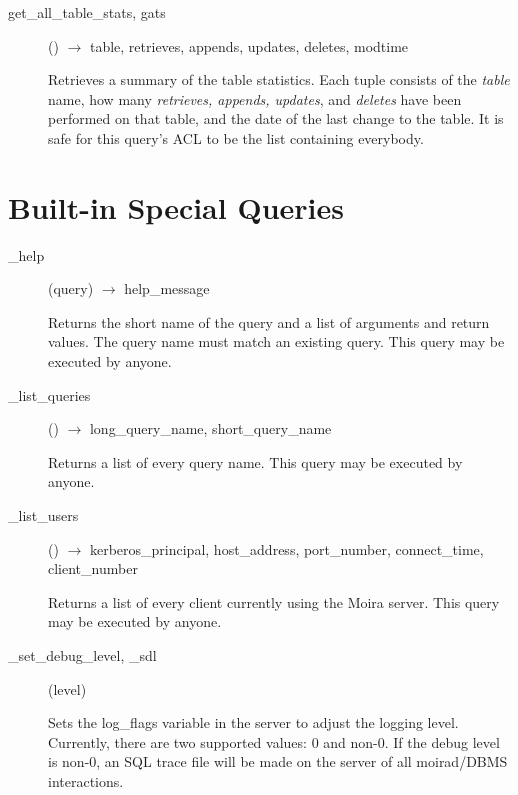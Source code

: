 \documentclass{article}
\begin{document}
\begin{description}
\item[get\_all\_table\_stats, gats]() $\rightarrow$ table, retrieves, appends, updates,
deletes, modtime

Retrieves a summary of the table statistics.  Each tuple consists of
the {\em table} name, how many {\em retrieves, appends, updates}, and
{\em deletes} have been performed on that table, and the date of the
last change to the table.  It is safe for this query's ACL to be the
list containing everybody.

\end{description}

\section{Built-in Special Queries}

\begin{description}

\item[\_help](query) $\rightarrow$ help\_message

Returns the short name of the query and a list of arguments and return
values.  The query name must match an existing query.  This query may
be executed by anyone.

\item[\_list\_queries]() $\rightarrow$ long\_query\_name, short\_query\_name

Returns a list of every query name.  This query may be executed by
anyone.

\item[\_list\_users]() $\rightarrow$ kerberos\_principal, host\_address,
port\_number, connect\_time, client\_number

Returns a list of every client currently using the Moira server.  This
query may be executed by anyone.

\item[\_set\_debug\_level, \_sdl](level)

Sets the log\_flags variable in the server to adjust the logging level.
Currently, there are two supported values: 0 and non-0. If the debug
level is non-0, an SQL trace file will be made on the server of all
moirad/DBMS interactions.

\end{description}
\end{document}
